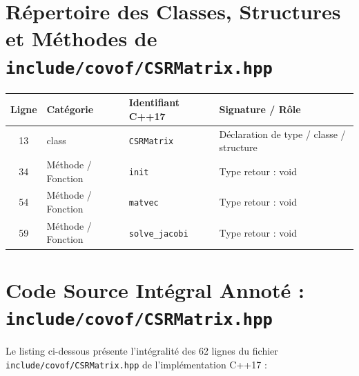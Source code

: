 \documentclass[10pt,a4paper,oneside]{book}
\begin{document}
\section{Répertoire des Classes, Structures et Méthodes de \texttt{include/covof/CSRMatrix.hpp}}
\begin{center}\small
\begin{tabular}{clll}
\toprule
\textbf{Ligne} & \textbf{Catégorie} & \textbf{Identifiant C++17} & \textbf{Signature / Rôle} \\
\midrule
13 & class & \texttt{CSRMatrix} & Déclaration de type / classe / structure \\
34 & Méthode / Fonction & \texttt{init} & Type retour : void \\
54 & Méthode / Fonction & \texttt{matvec} & Type retour : void \\
59 & Méthode / Fonction & \texttt{solve\_jacobi} & Type retour : void \\
\bottomrule
\end{tabular}
\end{center}

\section{Code Source Intégral Annoté : \texttt{include/covof/CSRMatrix.hpp}}
Le listing ci-dessous présente l'intégralité des 62 lignes du fichier \texttt{include/covof/CSRMatrix.hpp} de l'implémentation C++17 :
\end{document}
